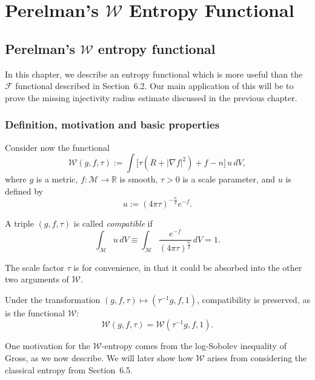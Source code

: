 \chapter{Perelman's \texorpdfstring{$\mathcal W$}{W} Entropy Functional}

\section{Perelman's \texorpdfstring{$\mathcal W$}{W} entropy functional}

In this chapter, we describe an entropy functional which is more useful than
the $\mathcal{F}$ functional described in Section~6.2. Our main application of
this will be to prove the missing injectivity radius estimate discussed in the
previous chapter.

\subsection{Definition, motivation and basic properties}

Consider now the functional
\[
\mathcal W(g,f,\tau) := \int \bigl[\tau(R + |\nabla f|^2) + f - n\bigr]\,u\,dV,
\]
where $g$ is a metric, $f : \mathcal M \to \mathbb R$ is smooth, $\tau > 0$
is a scale parameter, and $u$ is defined by
\[
u := (4\pi\tau)^{- \frac{n}{2}} e^{-f}.
\]

\begin{definition}
\label{topping-ch8-compatible-arguments}
A triple $(g,f,\tau)$ is called \emph{compatible} if
\[
\int_{\mathcal M} u\,dV \equiv \int_{\mathcal M} \frac{e^{-f}}{(4\pi\tau)^{\frac{n}{2}}}\,dV = 1.
\]
\end{definition}

The scale factor $\tau$ is for convenience, in that it could be absorbed into
the other two arguments of $\mathcal W$.

\begin{proposition}
\label{topping-ch8-scale-invariance}
Under the transformation $(g,f,\tau)\mapsto(\tau^{-1}g,f,1)$, compatibility is preserved, as is the functional $\mathcal W$:
\[
\mathcal W(g,f,\tau)=\mathcal W(\tau^{-1}g,f,1).
\]
\end{proposition}

One motivation for the $\mathcal W$-entropy comes from the log-Sobolev
inequality of Gross, as we now describe. We will later show how $\mathcal W$
arises from considering the classical entropy from Section~6.5.

